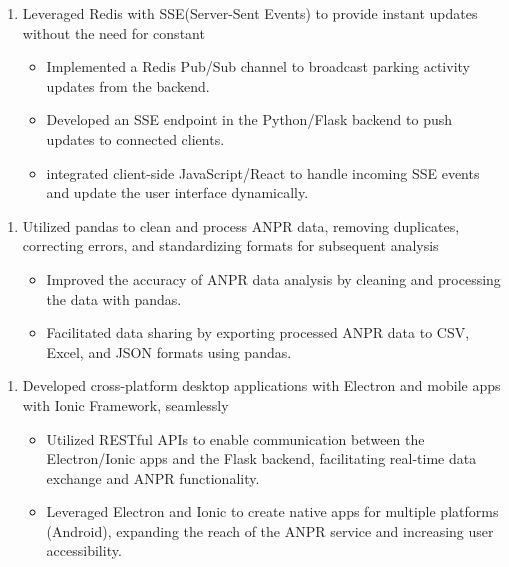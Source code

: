 \documentclass{article}
\begin{document}
\begin{enumerate}
    \item[]  Leveraged Redis with SSE(Server-Sent Events) to provide instant updates without the need for constant
    \begin{itemize}
    \item Implemented a Redis Pub/Sub channel to broadcast parking activity updates from the backend.
    \item Developed an SSE endpoint in the Python/Flask backend to push updates to connected clients.
    \item integrated client-side JavaScript/React  to handle incoming SSE events and update the user interface dynamically.
    \end{itemize}
 \end{enumerate}


\begin{enumerate}
    \item[] Utilized pandas to clean and process ANPR data,  removing duplicates, correcting errors, and standardizing formats for subsequent analysis
   \begin{itemize}
    \item Improved the accuracy of ANPR data analysis by  cleaning and processing the data with pandas. 
    \item Facilitated data sharing  by exporting processed ANPR data to CSV, Excel, and JSON formats using pandas.
   \end{itemize}
\end{enumerate}


\begin{enumerate}
    \item[]  Developed cross-platform desktop applications with Electron and mobile apps with Ionic Framework, seamlessly
   \begin{itemize}
    \item Utilized RESTful APIs to enable communication between the Electron/Ionic apps and the Flask backend, facilitating real-time data exchange and ANPR functionality.
    \item Leveraged Electron and Ionic to create native apps for multiple platforms (Android), expanding the reach of the ANPR service and increasing user accessibility.
   \end{itemize}
\end{enumerate}
\end{document}
